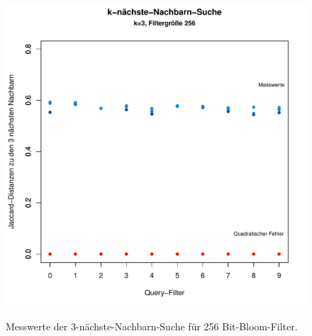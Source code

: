 \begin{figure}
	\includegraphics[scale=0.7]{pictures/nn3_256-2.pdf}\\
	\caption[Messwerte der 3-nächste-Nachbarn-Suche für 256 Bit-Bloom-Filter]{Messwerte der 3-nächste-Nachbarn-Suche für 256 Bit-Bloom-Filter.}\label{fig:pic11}
\end{figure}
